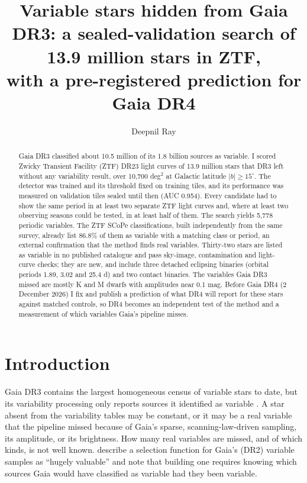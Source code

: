 \documentclass[twocolumn]{searchchev_preprint}
\begin{document}
\title{Variable stars hidden from Gaia DR3: a sealed-validation search of 13.9 million stars in ZTF,\\
with a pre-registered prediction for Gaia DR4}

\author[0000-0001-8779-0700]{Deepnil Ray}

\begin{abstract}
Gaia DR3 classified about 10.5 million of its 1.8 billion sources as variable. I
scored Zwicky Transient Facility (ZTF) DR23 light curves of 13.9 million stars that DR3 left without any
variability result, over 10,700 deg$^2$ at Galactic latitude $|b|\ge15^\circ$. The detector was trained and its threshold
fixed on training tiles, and its performance was measured on validation tiles sealed until then (AUC 0.954). Every
candidate had to show the same period in at least two separate ZTF light curves and, where at least two observing
seasons could be tested, in at least half of them. The search yields 5,778 periodic variables. The ZTF SCoPe classifications, built
independently from the same survey, already list 86.8\% of them as variable with a matching class or period, an
external confirmation that the method finds real variables. Thirty-two stars are listed as variable in no published
catalogue and pass sky-image, contamination and light-curve checks; they are new, and include three detached
eclipsing binaries (orbital periods 1.89, 3.02 and 25.4 d) and two contact binaries. The variables Gaia DR3 missed
are mostly K and M dwarfs with amplitudes near 0.1 mag. Before Gaia DR4 (2 December 2026) I fix and publish a
prediction of what DR4 will report for these stars against matched controls, so DR4 becomes an independent test of
the method and a measurement of which variables Gaia's pipeline misses.
\end{abstract}


\section{Introduction}
Gaia \citep{Gaia2016} DR3 \citep{Gaia2023} contains the largest homogeneous census of variable stars to date, but its
variability processing only reports sources it identified as variable \citep{Eyer2023,Rimoldini2023}. A star absent from the variability tables may be constant,
or it may be a real variable that the pipeline missed because of Gaia's sparse, scanning-law-driven sampling, its
amplitude, or its brightness. How many real variables are missed, and of which kinds, is not well known.
\citet{Everall2022} describe a selection function for Gaia's (DR2) variable samples as ``hugely valuable'' and note that
building one requires knowing which sources Gaia would have classified as variable had they been variable.
\end{document}
